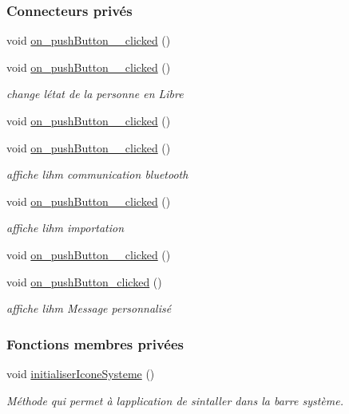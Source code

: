 \subsubsection*{Connecteurs privés}
\begin{DoxyCompactItemize}
\item 
void \hyperlink{class_ihm_groom_adc890fcb2368c7bf7654d8ed4af4912a}{on\+\_\+push\+Button\+\_\+\_\+clicked} ()
\item 
void \hyperlink{class_ihm_groom_a1d981f0754a5fa2b01036fc5125fded2}{on\+\_\+push\+Button\+\_\+\_\+clicked} ()
\begin{DoxyCompactList}\small\item\em change l\textquotesingle{}état de la personne en Libre \end{DoxyCompactList}\item 
void \hyperlink{class_ihm_groom_addb07bf87d4d6f7eb5604d742a6bf2ef}{on\+\_\+push\+Button\+\_\+\_\+clicked} ()
\item 
void \hyperlink{class_ihm_groom_a1bbde232f2fb38daedaa4562dfc8d1b5}{on\+\_\+push\+Button\+\_\+\_\+clicked} ()
\begin{DoxyCompactList}\small\item\em affiche l\textquotesingle{}ihm communication bluetooth \end{DoxyCompactList}\item 
void \hyperlink{class_ihm_groom_ac69005aef7c31e888d64890eb45c5e64}{on\+\_\+push\+Button\+\_\+\_\+clicked} ()
\begin{DoxyCompactList}\small\item\em affiche l\textquotesingle{}ihm importation \end{DoxyCompactList}\item 
void \hyperlink{class_ihm_groom_a5f8398886e8daa04d5a0f3119f307f14}{on\+\_\+push\+Button\+\_\+\_\+clicked} ()
\item 
void \hyperlink{class_ihm_groom_ad3fbc13397279793b240d54b5a5f20b4}{on\+\_\+push\+Button\+\_\+clicked} ()
\begin{DoxyCompactList}\small\item\em affiche l\textquotesingle{}ihm Message personnalisé \end{DoxyCompactList}\end{DoxyCompactItemize}
\subsubsection*{Fonctions membres privées}
\begin{DoxyCompactItemize}
\item 
void \hyperlink{class_ihm_groom_addfe25c3da6ddecfbdcb5b3cf062d724}{initialiser\+Icone\+Systeme} ()
\begin{DoxyCompactList}\small\item\em Méthode qui permet à l\textquotesingle{}application de s\textquotesingle{}intaller dans la barre système. \end{DoxyCompactList}\end{DoxyCompactItemize}
